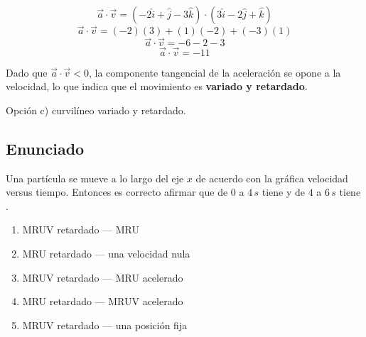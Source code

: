 \documentclass[12pt, a4paper]{article}
\begin{document}
$$\vec{a} \cdot \vec{v} = ( -2\hat{i} + \hat{j} - 3\hat{k} ) \cdot ( 3\hat{i} - 2\hat{j} + \hat{k} )$$
$$\vec{a} \cdot \vec{v} = (-2)(3) + (1)(-2) + (-3)(1)$$
$$\vec{a} \cdot \vec{v} = -6 - 2 - 3$$
$$\vec{a} \cdot \vec{v} = -11$$

Dado que $\vec{a} \cdot \vec{v} < 0$, la componente tangencial de la aceleración se opone a la velocidad, lo que indica que el movimiento es \textbf{variado y retardado}.

\begin{tcolorbox}[colback=green!5!white, colframe=green!50!black, title=Respuesta Final]
\centering Opción c) curvilíneo variado y retardado.
\end{tcolorbox}

\newpage

\subsection*{Enunciado}
Una partícula se mueve a lo largo del eje $x$ de acuerdo con la gráfica velocidad versus tiempo. Entonces es correcto afirmar que de $0$ a $4 \, \si{s}$ tiene \underline{\hspace{3cm}} y de $4$ a $6 \, \si{s}$ tiene \underline{\hspace{3cm}}.

\begin{enumerate}[label=\alph*)]
    \item MRUV retardado --- MRU
    \item MRU retardado --- una velocidad nula
    \item MRUV retardado --- MRU acelerado
    \item MRU retardado --- MRUV acelerado
    \item MRUV retardado --- una posición fija
\end{enumerate}

\begin{center}
\end{center}
\end{document}
